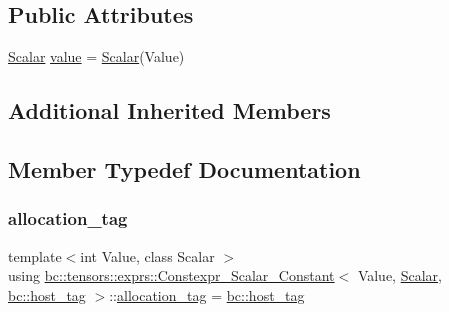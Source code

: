 \subsection*{Public Attributes}
\begin{DoxyCompactItemize}
\item 
\hyperlink{namespacebc_aa12ac55ee2c43dc082894dd3859daee1}{Scalar} \hyperlink{structbc_1_1tensors_1_1exprs_1_1Constexpr__Scalar__Constant_3_01Value_00_01Scalar_00_01bc_1_1host__tag_01_4_a4668c5ae53ab89e7051525b4182ee008}{value} = \hyperlink{namespacebc_aa12ac55ee2c43dc082894dd3859daee1}{Scalar}(Value)
\end{DoxyCompactItemize}
\subsection*{Additional Inherited Members}


\subsection{Member Typedef Documentation}
\mbox{\label{structbc_1_1tensors_1_1exprs_1_1Constexpr__Scalar__Constant_3_01Value_00_01Scalar_00_01bc_1_1host__tag_01_4_aa81e090c91ed93bd4cd48557ad82c2d9}} 
\subsubsection{\texorpdfstring{allocation\+\_\+tag}{allocation\_tag}}
{\footnotesize\ttfamily template$<$int Value, class Scalar $>$ \\
using \hyperlink{structbc_1_1tensors_1_1exprs_1_1Constexpr__Scalar__Constant}{bc\+::tensors\+::exprs\+::\+Constexpr\+\_\+\+Scalar\+\_\+\+Constant}$<$ Value, \hyperlink{namespacebc_aa12ac55ee2c43dc082894dd3859daee1}{Scalar}, \hyperlink{structbc_1_1host__tag}{bc\+::host\+\_\+tag} $>$\+::\hyperlink{structbc_1_1tensors_1_1exprs_1_1Constexpr__Scalar__Constant_3_01Value_00_01Scalar_00_01bc_1_1host__tag_01_4_aa81e090c91ed93bd4cd48557ad82c2d9}{allocation\+\_\+tag} =  \hyperlink{structbc_1_1host__tag}{bc\+::host\+\_\+tag}}

